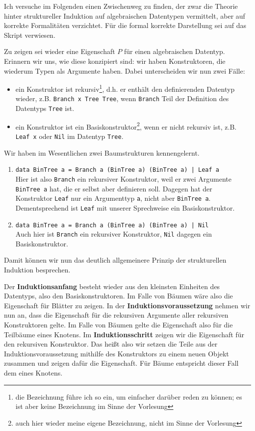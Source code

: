 \documentclass[ngerman, a4paper, 11pt]{article}
\newcommand{\begriff}[1]{\textbf{#1}}
\theoremstyle{nonumberplain}
\begin{document}
Ich versuche im Folgenden einen Zwischenweg zu finden, der zwar die Theorie hinter struktureller Induktion auf algebraischen Datentypen vermittelt, aber auf korrekte Formalitäten verzichtet. Für die formal korrekte Darstellung sei auf das Skript verwiesen.

Zu zeigen sei wieder eine Eigenschaft $P$ für einen algebraischen Datentyp. Erinnern wir uns, wie diese konzipiert sind: wir haben Konstruktoren, die wiederum Typen als Argumente haben. Dabei unterscheiden wir nun zwei Fälle:
\begin{itemize}
	\item ein Konstruktor ist rekursiv\footnote{die Bezeichnung führe ich so ein, um einfacher darüber reden zu können; es ist aber keine Bezeichnung im Sinne der Vorlesung}, d.h. er enthält den definierenden Datentyp wieder, z.B. \texttt{Branch x Tree Tree}, wenn \texttt{Branch} Teil der Definition des Datentyps \texttt{Tree} ist.
	\item ein Konstruktor ist ein Basiskonstruktor\footnote{auch hier wieder meine eigene Bezeichnung, nicht im Sinne der Vorlesung}, wenn er nicht rekursiv ist, z.B. \texttt{Leaf x} oder \texttt{Nil} im Datentyp \texttt{Tree}.
\end{itemize}

Wir haben im Wesentlichen zwei Baumstrukturen kennengelernt.
\begin{enumerate}
	\item \texttt{data BinTree a = Branch a (BinTree a) (BinTree a) | Leaf a} \\
	Hier ist also \texttt{Branch} ein rekursiver Konstruktor, weil er zwei Argumente \texttt{BinTree a} hat, die er selbst aber definieren soll. Dagegen hat der Konstruktor \texttt{Leaf} nur ein Argumenttyp \texttt{a}, nicht aber \texttt{BinTree a}. Dementsprechend ist \texttt{Leaf} mit unserer Sprechweise ein Basiskonstruktor.
	\item \texttt{data BinTree a = Branch a (BinTree a) (BinTree a) | Nil} \\
	Auch hier ist \texttt{Branch} ein rekursiver Konstruktor, \texttt{Nil} dagegen ein Basiskonstruktor.
\end{enumerate}

Damit können wir nun das deutlich allgemeinere Prinzip der strukturellen Induktion besprechen. 

Der \begriff{Induktionsanfang} besteht wieder aus den kleinsten Einheiten des Datentyps, also den Basiskonstruktoren. Im Falle von Bäumen wäre also die Eigenschaft für Blätter zu zeigen. 
In der \begriff{Induktionsvoraussetzung} nehmen wir nun an, dass die Eigenschaft für die rekursiven Argumente aller rekursiven Konstruktoren gelte. Im Falle von Bäumen gelte die Eigenschaft also für die Teilbäume eines Knotens. 
Im \begriff{Induktionsschritt} zeigen wir die Eigenschaft für den rekursiven Konstruktor. Das heißt also wir setzen die Teile aus der Induktionsvoraussetzung mithilfe des Konstruktors zu einem neuen Objekt zusammen und zeigen dafür die Eigenschaft. Für Bäume entspricht dieser Fall dem eines Knotens. 
\end{document}
